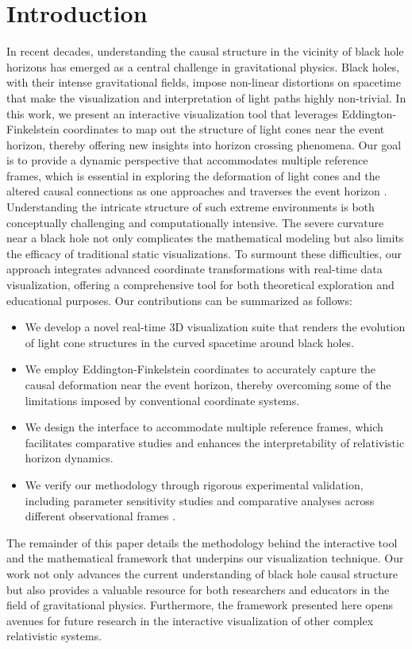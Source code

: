 \documentclass{article}
\begin{document}
\section{Introduction} In recent decades, understanding the causal structure in the vicinity of black hole horizons has emerged as a central challenge in gravitational physics. Black holes, with their intense gravitational fields, impose non-linear distortions on spacetime that make the visualization and interpretation of light paths highly non-trivial. In this work, we present an interactive visualization tool that leverages Eddington-Finkelstein coordinates to map out the structure of light cones near the event horizon, thereby offering new insights into horizon crossing phenomena. Our goal is to provide a dynamic perspective that accommodates multiple reference frames, which is essential in exploring the deformation of light cones and the altered causal connections as one approaches and traverses the event horizon \cite{Einstein1916, Hawking1973}.  Understanding the intricate structure of such extreme environments is both conceptually challenging and computationally intensive. The severe curvature near a black hole not only complicates the mathematical modeling but also limits the efficacy of traditional static visualizations. To surmount these difficulties, our approach integrates advanced coordinate transformations with real-time data visualization, offering a comprehensive tool for both theoretical exploration and educational purposes.  Our contributions can be summarized as follows: \begin{itemize}     \item We develop a novel real-time 3D visualization suite that renders the evolution of light cone structures in the curved spacetime around black holes.     \item We employ Eddington-Finkelstein coordinates to accurately capture the causal deformation near the event horizon, thereby overcoming some of the limitations imposed by conventional coordinate systems.     \item We design the interface to accommodate multiple reference frames, which facilitates comparative studies and enhances the interpretability of relativistic horizon dynamics.     \item We verify our methodology through rigorous experimental validation, including parameter sensitivity studies and comparative analyses across different observational frames \cite{Penrose1965, Misner1973}. \end{itemize}  The remainder of this paper details the methodology behind the interactive tool and the mathematical framework that underpins our visualization technique. Our work not only advances the current understanding of black hole causal structure but also provides a valuable resource for both researchers and educators in the field of gravitational physics. Furthermore, the framework presented here opens avenues for future research in the interactive visualization of other complex relativistic systems.
\end{document}
